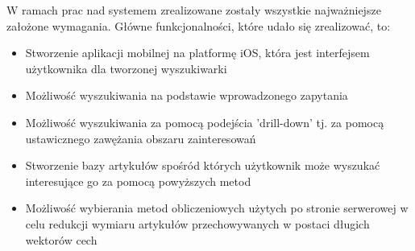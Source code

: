 W ramach prac nad systemem zrealizowane zostały wszystkie najważniejsze założone wymagania.
Główne funkcjonalności, które udało się zrealizować, to:

\begin{itemize}
  \item Stworzenie aplikacji mobilnej na platformę iOS, która jest interfejsem użytkownika dla tworzonej wyszukiwarki
  \item Możliwość wyszukiwania na podstawie wprowadzonego zapytania
  \item Możliwość wyszukiwania za pomocą podejścia 'drill-down' tj. za pomocą ustawicznego zawężania obszaru zainteresowań
  \item Stworzenie bazy artykułów spośród których użytkownik może wyszukać interesujące go za pomocą powyższych metod
  \item Możliwość wybierania metod obliczeniowych użytych po stronie serwerowej w celu redukcji wymiaru artykułów przechowywanych w postaci długich wektorów cech
\end{itemize}




